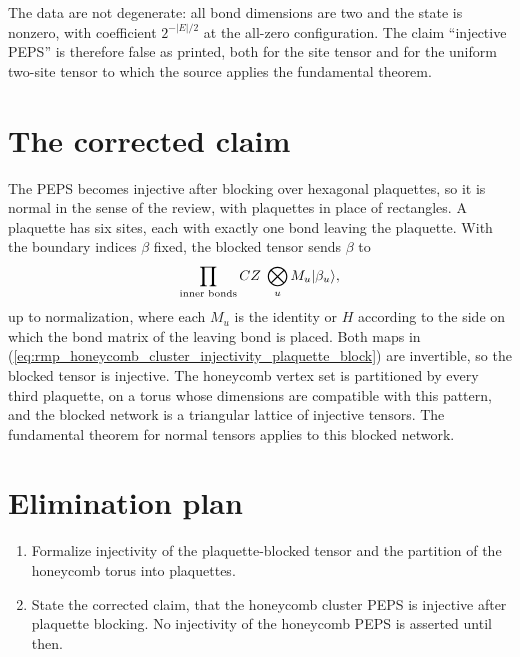 \documentclass{article}
\begin{document}
The data are not degenerate: all bond dimensions are two and the state is
nonzero, with coefficient $2^{-|E|/2}$ at the all-zero configuration. The
claim ``injective PEPS'' is therefore false as printed, both for the site
tensor and for the uniform two-site tensor to which the source applies the
fundamental theorem.

\section{The corrected claim}
The PEPS becomes injective after blocking over hexagonal plaquettes, so it is
normal in the sense of the review, with plaquettes in place of rectangles. A
plaquette has six sites, each with exactly one bond leaving the plaquette.
With the boundary indices $\beta$ fixed, the blocked tensor sends $\beta$ to
\begin{align}
    \prod_{\text{inner bonds}}CZ\;\bigotimes_{u}M_u|\beta_u\rangle,
    \label{eq:rmp_honeycomb_cluster_injectivity_plaquette_block}
\end{align}
up to normalization, where each $M_u$ is the identity or $H$ according to the
side on which the bond matrix of the leaving bond is placed. Both maps in
(\ref{eq:rmp_honeycomb_cluster_injectivity_plaquette_block}) are invertible, so
the blocked tensor is injective. The honeycomb vertex set is
partitioned by every third plaquette, on a torus whose dimensions are
compatible with this pattern, and the blocked network is a triangular lattice
of injective tensors. The fundamental theorem for normal tensors applies to
this blocked network.

\section{Elimination plan}
\begin{enumerate}
    \item Formalize injectivity of the plaquette-blocked tensor and the
          partition of the honeycomb torus into plaquettes.
    \item State the corrected claim, that the honeycomb cluster PEPS is
          injective after plaquette blocking. No injectivity of the
          honeycomb PEPS is asserted until then.
\end{enumerate}



\end{document}
